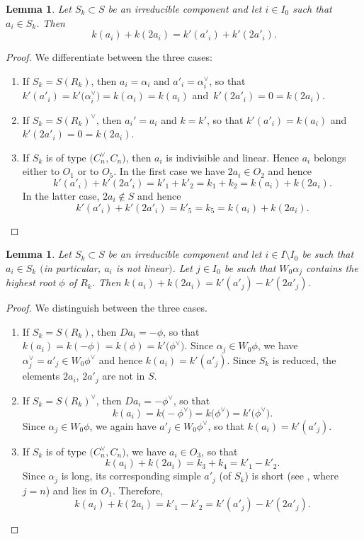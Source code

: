 \documentclass[10pt,a4paper]{amsart}
\newtheorem{Lemma}[Theorem]{Lemma}
\theoremstyle{definition}
\numberwithin{equation}{section}
\begin{document}
\begin{Lemma}\label{sec:lem-ks1}
 Let $S_k\subset S$ be an irreducible component and let $i\in I_0$ such that $a_i\in S_k$.
 Then
 \[
 k(a_i) + k(2a_i) = k'(a'_i) + k'(2a'_i).
 \]
\end{Lemma}
\begin{proof}
 We differentiate between the three cases:
 \begin{enumerate}\itemsep=0pt
 \item If $S_k=S(R_k)$, then $a_i=\alpha_i$ and $a'_i=\alpha_i^\vee$,
 so that
$
 k'(a'_i)=k'\bigl(\alpha_i^\vee\bigr)=k(\alpha_i)=k(a_i)
$
 and~${k'(2a'_i)=0=k(2a_i)}$.
 \item If $S_k=S(R_k)^\vee$, then $a_i'=a_i$ and $k=k'$, so that
 $k'(a'_i)=k(a_i)$ and $k'(2a'_i)=0=k(2a_i)$.
 \item If $S_k$ is of type $\bigl(C_n^\vee, C_n\bigr)$,
 then $a_i$ is indivisible and linear. Hence $a_i$ belongs either to
 $O_1$ or to $O_5$. In the first case we have $2a_i\in O_2$ and hence
 \[
 k'(a'_i) + k'(2a'_i)
 = k'_1 + k'_2 = k_1 + k_2
 = k(a_i) + k(2a_i).
 \]
 In the latter case, $2a_i\not\in S$ and hence
 \[
 k'(a'_i) + k'(2a'_i) = k'_5 = k_5 = k(a_i) + k(2a_i).\tag*{\qed}
 \]
 \end{enumerate}\renewcommand{\qed}{}
\end{proof}

\begin{Lemma}\label{sec:lem-ks2}
 Let $S_k\subset S$ be an irreducible component and let $i\in I\setminus I_0$ be such that $a_i\in S_k$ $($in particular, $a_i$ is not linear$)$.
 Let $j\in I_0$ be such that $W_0\alpha_j$ contains the highest root
 $\phi$ of $R_k$. Then
$
 k(a_i)+k(2a_i) = k'(a'_j) - k'(2a'_j)$.
\end{Lemma}
\begin{proof}
 We distinguish between the three cases.
 \begin{enumerate}\itemsep=0pt
 \item If $S_k=S(R_k)$, then $Da_i=-\phi$, so that
$
 k(a_i)=k(-\phi) = k(\phi) = k'\bigl(\phi^\vee\bigr)$.
 Since $\alpha_j\in W_0\phi$, we have $\alpha_j^\vee=a'_j\in W_0\phi^\vee$ and hence $k(a_i)=k'(a'_j)$. Since $S_k$ is reduced,
 the elements $2a_i$, $2a'_j$ are not in $S$.
 \item If $S_k=S(R_k)^\vee$, then $Da_i=-\phi^\vee$, so that
 \[
 k(a_i) = k\bigl(-\phi^\vee\bigr)=k\bigl(\phi^\vee\bigr)=
 k'\bigl(\phi^\vee\bigr).
 \]
 Since $\alpha_j\in W_0\phi$, we again have $a'_j\in W_0\phi^\vee$, so that $k(a_i)=k'(a'_j)$.
 \item If $S_k$ is of type $\bigl(C_n^\vee, C_n\bigr)$,
 we have $a_i\in O_3$, so that
 \[
 k(a_i)+k(2a_i)=k_3+k_4 = k'_1-k'_2.
 \]
 Since $\alpha_j$ is long, its corresponding simple $a'_j$ (of $S_k$) is short (see \cite[Section~1.4.3]{macdonald}, where~${j=n}$)
 and lies in $O_1$.
 Therefore,
 \[
 k(a_i)+k(2a_i) = k'_1-k'_2 = k'(a'_j)-k'(2a'_j).\tag*{\qed}
 \]
 \end{enumerate}\renewcommand{\qed}{}
\end{proof}
\end{document}
